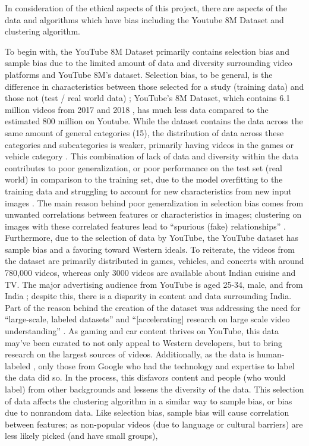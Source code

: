 \documentclass[10pt,twocolumn]{article}
\begin{document}
In consideration of the ethical aspects of this project, there are aspects of the data and algorithms which have bias including the Youtube 8M Dataset and clustering algorithm.


To begin with, the YouTube 8M Dataset primarily contains selection bias and sample bias due to the limited amount of data and diversity surrounding video platforms and YouTube 8M’s dataset. Selection bias, to be general, is the difference in characteristics between those selected for a study (training data) and those not (test / real world data) \cite{Yu2020}; YouTube’s 8M Dataset, which contains 6.1 million videos from 2017 and 2018 \cite{googleYT8M}, has much less data compared to the estimated 800 million on Youtube. While the dataset contains the data across the same amount of general categories (15), the distribution of data across these categories and subcategories is weaker, primarily having videos in the games or vehicle category \cite{googleYT8M}. This combination of lack of data and diversity within the data contributes to poor generalization, or poor performance on the test set (real world) in comparison to the training set, due to the model overfitting to the training data and struggling to account for new characteristics from new input images \cite{Yu2020}. The main reason behind poor generalization in selection bias comes from unwanted correlations between features or characteristics in images; clustering on images with these correlated features lead to “spurious (fake) relationships” \cite{Yu2020}. Furthermore, due to the selection of data by YouTube, the YouTube dataset has sample bias and a favoring toward Western ideals. To reiterate, the videos from the dataset are primarily distributed in games, vehicles, and concerts with around 780,000 videos, whereas only 3000 videos are available about Indian cuisine and TV. The major advertising audience from YouTube is aged 25-34, male, and from India \cite{HootSuite2022}; despite this, there is a disparity in content and data surrounding India. Part of the reason behind the creation of the dataset was addressing the need for “large-scale, labeled datasets” and “[accelerating] research on large scale video understanding” \cite{Warrick2020}. As gaming and car content thrives on YouTube, this data may’ve been curated to not only appeal to Western developers, but to bring research on the largest sources of videos. Additionally, as the data is human-labeled \cite{googleYT8M}, only those from Google who had the technology and expertise to label the data did so. In the process, this disfavors content and people (who would label) from other backgrounds and lessens the diversity of the data. This selection of data affects the clustering algorithm in a similar way to sample bias, or bias due to nonrandom data. Like selection bias, sample bias will cause correlation between features; as non-popular videos (due to language or cultural barriers) are less likely picked (and have small groups), 
\end{document}
